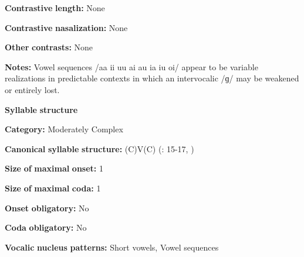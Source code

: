 \begin{styleBody}
\textbf{Contrastive} \textbf{length:} None
\end{styleBody}

\begin{styleBody}
\textbf{Contrastive} \textbf{nasalization:} None
\end{styleBody}

\begin{styleBody}
\textbf{Other} \textbf{contrasts:} None
\end{styleBody}

\begin{styleBody}
\textbf{Notes:} Vowel sequences /aa ii uu ai au ia iu oi/ appear to be variable realizations in predictable contexts in which an intervocalic /ɡ/ may be weakened or entirely lost.
\end{styleBody}

\begin{styleBody}
\textbf{Syllable} \textbf{structure}
\end{styleBody}

\begin{styleBody}
\textbf{Category:} Moderately Complex
\end{styleBody}

\begin{styleBody}
\textbf{Canonical} \textbf{syllable} \textbf{structure:} (C)V(C) (\citealt{Hutchison1981}: 15-17, \citealt{Cyffer1998})
\end{styleBody}

\begin{styleBody}
\textbf{Size} \textbf{of} \textbf{maximal} \textbf{onset:} 1
\end{styleBody}

\begin{styleBody}
\textbf{Size} \textbf{of} \textbf{maximal} \textbf{coda:} 1
\end{styleBody}

\begin{styleBody}
\textbf{Onset} \textbf{obligatory:} No
\end{styleBody}

\begin{styleBody}
\textbf{Coda} \textbf{obligatory:} No
\end{styleBody}

\begin{styleBody}
\textbf{Vocalic} \textbf{nucleus} \textbf{patterns:} Short vowels, Vowel sequences
\end{styleBody}

